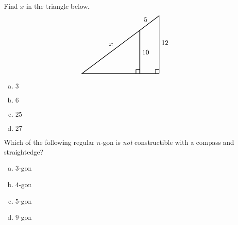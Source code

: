 \documentclass[12pt,letterpaper]{exam}
\begin{document}
\begin{questions}
\question Find $x$ in the triangle below. 
	\[
	\begin{tikzpicture}
	\draw[line width=0.03cm] (0,0) -- (0,3) -- (-4,0) -- (0,0);
	\draw[line width=0.03cm] (-1,0) -- (-1,2.25);
	\draw[line width=0.03cm] (0,0.2) -- (-0.2,0.2) -- (-0.2,0);
	\draw[line width=0.03cm] (-1,0.2) -- (-1.2,0.2) -- (-1.2,0);
	\node at (0.3,1.6) {$12$};
	\node at (-0.7,1.1) {$10$};
	\node at (-0.7,2.8) {$5$};
	\node at (-2.5,1.5) {$x$};
	\end{tikzpicture}
	\]

\begin{enumerate}[(a)]
\item $3$
\item $6$
\item $25$
\item $27$
\end{enumerate} \vfill



\question Which of the following regular $n$-gon is \textit{not} constructible with a compass and straightedge?
	\begin{enumerate}[(a)]
	\item $3$-gon
	\item $4$-gon
	\item $5$-gon
	\item $9$-gon
	\end{enumerate} \vfill


\end{questions}
\end{document}
